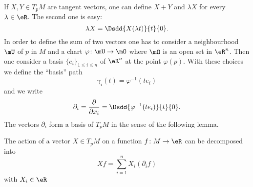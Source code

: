 If \( X,Y\in T_pM\) are tangent vectors, one can define \( X+Y\) and \( \lambda X\) for every \( \lambda\in\eR\). The second one is easy:
\begin{equation}
    \lambda X=\Dsdd{ X(\lambda t) }{t}{0}.
\end{equation}
In order to define the sum of two vectors one has to consider a neighbourhood \( \mU\) of \( p\) in \( M\) and a chart \( \varphi\colon \mU\to \mO\) where \( \mO\) is an open set in \( \eR^n\). Then one consider a basis \( \{ e_i \}_{1\leq i\leq n}\) of \( \eR^n\) at the point \( \varphi(p)\). With these choices we define the ``basis'' path
\begin{equation}
    \gamma_i(t)=\varphi^{-1}(te_i)
\end{equation}
and we write
\begin{equation}
    \partial_i=\frac{ \partial  }{ \partial x_i }=\Dsdd{ \varphi^{-1}(te_i) }{t}{0}.
\end{equation}
The vectors \( \partial_i\) form a basis of \( T_pM\) in the sense of the following lemma.

\begin{lemma}       \label{LEMooXDESooHXzIJU}
    The action of a vector \( X\in T_pM\) on a function \( f\colon M\to \eR\) can be decomposed into
    \begin{equation}
        Xf=\sum_{i=1}^n X_i(\partial_if)
    \end{equation}
    with \( X_i\in\eR\)
\end{lemma}

